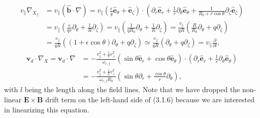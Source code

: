 \documentclass[12pt]{article}
\numberwithin{equation}{subsection}
\begin{document}
   \begin{equation}
   \begin{aligned}
         v_\parallel\nabla_{X_\parallel} &= 
         v_\parallel(\bm{\hat{b}}\cdot\nabla) = v_\parallel(\frac{\epsilon}{q}\bm{\hat{e}}_\theta +
         \bm{\hat{e}}_\zeta)\cdot(\partial_r\bm{\hat{e}}_r + \frac{1}{r}\partial_\theta\bm{\hat{e}}_\theta + \frac{1}{R_0 +
         r\cos\theta}\partial_\zeta\bm{\hat{e}}_\zeta) \\ &= 
         v_\parallel(\frac{\epsilon}{q r}\partial_\theta + \frac{1}{R}\partial_\zeta) = v_\parallel(\frac{1}{q R_0}\partial_\theta
         + \frac{1}{R}\partial_\zeta) = \frac{v_\parallel}{q R}(\frac{R}{R_0}\partial_\theta + q\partial_\zeta) \\ &=
         \frac{v_\parallel}{q R}((1+\epsilon\cos\theta)\partial_\theta + q\partial_\zeta)
         \simeq \frac{v_\parallel}{q R}(\partial_\theta + q\partial_\zeta) = v_\parallel\frac{\partial}{\partial l},
   \end{aligned}
   \end{equation}
   \begin{equation}
   \begin{aligned}
      \bm{v}_d\cdot\nabla_X = \bm{v}_d\cdot\nabla &= -\frac{v_\parallel^2 + \frac{1}{2}v_\perp^2}{\omega_{c,j}}
      (\sin\theta\bm{\hat{e}}_r + \cos\theta\bm{\hat{e}}_\theta)
      \cdot(\partial_r\bm{\hat{e}}_r + \frac{1}{r}\partial_\theta\bm{\hat{e}}_\theta) \\
      &= -\frac{v_\parallel^2 + \frac{1}{2}v_\perp^2}{\omega_{c,j}R_0}(\sin\theta\partial_r + \frac{\cos\theta}{r}\partial_\theta),
   \end{aligned}
   \end{equation}
with $l$ being the length along the field lines. Note that we have dropped the non-linear $\bm{E}\times\bm{B}$ drift term on the left-hand
side of (3.1.6) because we are interested in linearizing this equation.
\end{document}
